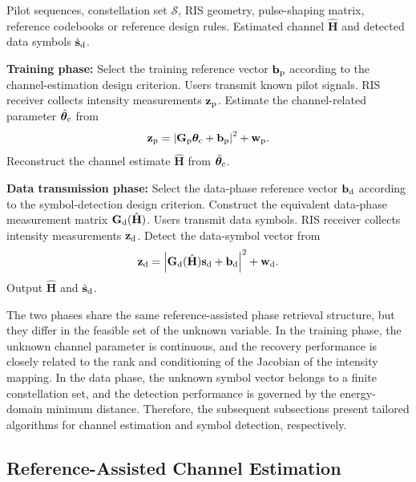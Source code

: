 \documentclass[journal]{IEEEtran}
\begin{document}
\begin{algorithm}[t]
\caption{Two-Phase Reference-Assisted Holographic Reception}
\label{alg:two_phase_recovery}
\begin{algorithmic}[1]
\REQUIRE Pilot sequences, constellation set $\mathcal{S}$, RIS geometry, pulse-shaping matrix, reference codebooks or reference design rules.
\ENSURE Estimated channel $\hat{\mathbf{H}}$ and detected data symbols $\hat{\mathbf{s}}_{\rm d}$.

\STATE \textbf{Training phase:}
\STATE Select the training reference vector $\mathbf{b}_{\rm p}$ according to the channel-estimation design criterion.
\STATE Users transmit known pilot signals.
\STATE RIS receiver collects intensity measurements $\mathbf{z}_{\rm p}$.
\STATE Estimate the channel-related parameter $\hat{\boldsymbol{\theta}}_{\rm c}$ from
\[
\mathbf{z}_{\rm p}
=
\left|
\mathbf{G}_{\rm p}\boldsymbol{\theta}_{\rm c}
+
\mathbf{b}_{\rm p}
\right|^2
+
\mathbf{w}_{\rm p}.
\]
\STATE Reconstruct the channel estimate $\hat{\mathbf{H}}$ from $\hat{\boldsymbol{\theta}}_{\rm c}$.

\STATE \textbf{Data transmission phase:}
\STATE Select the data-phase reference vector $\mathbf{b}_{\rm d}$ according to the symbol-detection design criterion.
\STATE Construct the equivalent data-phase measurement matrix $\mathbf{G}_{\rm d}(\hat{\mathbf{H}})$.
\STATE Users transmit data symbols.
\STATE RIS receiver collects intensity measurements $\mathbf{z}_{\rm d}$.
\STATE Detect the data-symbol vector from
\[
\mathbf{z}_{\rm d}
=
\left|
\mathbf{G}_{\rm d}(\hat{\mathbf{H}})\mathbf{s}_{\rm d}
+
\mathbf{b}_{\rm d}
\right|^2
+
\mathbf{w}_{\rm d}.
\]
\STATE Output $\hat{\mathbf{H}}$ and $\hat{\mathbf{s}}_{\rm d}$.
\end{algorithmic}
\end{algorithm}

The two phases share the same reference-assisted phase retrieval structure, but they differ in the feasible set of the unknown variable. 
In the training phase, the unknown channel parameter is continuous, and the recovery performance is closely related to the rank and conditioning of the Jacobian of the intensity mapping. 
In the data phase, the unknown symbol vector belongs to a finite constellation set, and the detection performance is governed by the energy-domain minimum distance. 
Therefore, the subsequent subsections present tailored algorithms for channel estimation and symbol detection, respectively.

\subsection{Reference-Assisted Channel Estimation}
\end{document}
